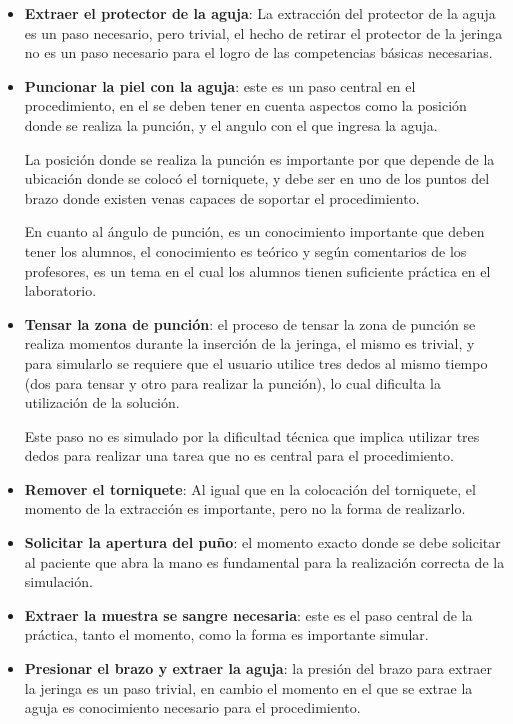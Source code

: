 \begin{itemize}
\item \textbf{Extraer el protector de la aguja}: La extracción del protector de
    la aguja es un paso necesario, pero trivial, el hecho de retirar el
    protector de la jeringa no es un paso necesario para el logro de las
    competencias básicas necesarias.

\item \textbf{Puncionar la piel con la aguja}: este es un paso central en el
    procedimiento, en el se deben tener en cuenta aspectos como la posición
    donde se realiza la punción, y el angulo con el que ingresa la aguja.

    La posición donde se realiza la punción es importante por que depende de la
    ubicación donde se colocó el torniquete, y debe ser en uno de los puntos del
    brazo donde existen venas capaces de soportar el procedimiento.

    En cuanto al ángulo de punción, es un conocimiento importante que deben
    tener los alumnos, el conocimiento es teórico y según comentarios de los
    profesores, es un tema en el cual los alumnos tienen suficiente práctica en
    el laboratorio.

\item \textbf{Tensar la zona de punción}: el proceso de tensar la zona de
    punción se realiza momentos durante la inserción de la jeringa, el mismo es
    trivial, y para simularlo se requiere que el usuario utilice tres dedos al
    mismo tiempo (dos para tensar y otro para realizar la punción), lo cual
    dificulta la utilización de la solución.

    Este paso no es simulado por la dificultad técnica que implica utilizar tres
    dedos para realizar una tarea que no es central para el procedimiento.

\item \textbf{Remover el torniquete}: Al igual que en la colocación del
    torniquete, el momento de la extracción es importante, pero no la forma de
    realizarlo.

\item \textbf{Solicitar la apertura del puño}: el momento exacto donde se debe
    solicitar al paciente que abra la mano es fundamental para la realización
    correcta de la simulación.

\item \textbf{Extraer la muestra se sangre necesaria}: este es el paso central
    de la práctica, tanto el momento, como la forma es importante simular.

\item \textbf{Presionar el brazo y extraer la aguja}: la presión del brazo para
    extraer la jeringa es un paso trivial, en cambio el momento en el que se
    extrae la aguja es conocimiento necesario para el procedimiento.


\end{itemize}
